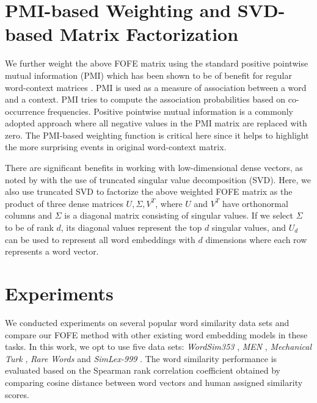\documentclass[11pt,letterpaper]{article}
\begin{document}
\section{PMI-based Weighting and SVD-based Matrix Factorization}
\label{ssec:SVD}

We further weight the above FOFE matrix using the standard positive pointwise mutual information (PMI)
\cite{Church:90} which has been shown to be of benefit for regular word-context matrices \cite{Pantel:02}.
PMI is used as a measure of association between a word and a context. 
PMI tries to compute the association probabilities based on co-occurrence frequencies. Positive pointwise mutual information is a commonly adopted approach where all negative values in the PMI matrix are replaced with zero. 
The PMI-based weighting function is critical here since it helps to highlight the more surprising events in original word-context matrix.

There are significant benefits in working with low-dimensional dense vectors, as noted by \cite{deerwester1990indexing} with the use of truncated singular value decomposition (SVD). Here, we also use truncated SVD to factorize the above weighted FOFE matrix as the product of three dense matrices $U, \Sigma, V^T$,
where $U$ and $V^T$ have orthonormal columns and $\Sigma$ is a diagonal matrix consisting of singular values. If we select $\Sigma$ to be of rank $d$, its diagonal values represent the top $d$ singular values, and $U_{d}$ can be used to represent all word embeddings with $d$ dimensions where each row represents a word vector.  

\section{Experiments}

\label{ssec:Experiments}


We conducted experiments on several popular word similarity data sets and compare our FOFE method with other existing word embedding models in these tasks. In this work, we opt to use five data sets: {\em WordSim353} \cite{finkelstein2001placing}, {\em MEN}  \cite{bruni2012distributional}, {\em Mechanical Turk} \cite{radinsky2011word}, {\em Rare Words} \cite{luong2013} and {\em SimLex-999} \cite{hill2015simlex}. The word similarity performance is  evaluated based on the Spearman rank correlation coefficient obtained by comparing cosine distance between word vectors and human assigned similarity scores.   
\end{document}
